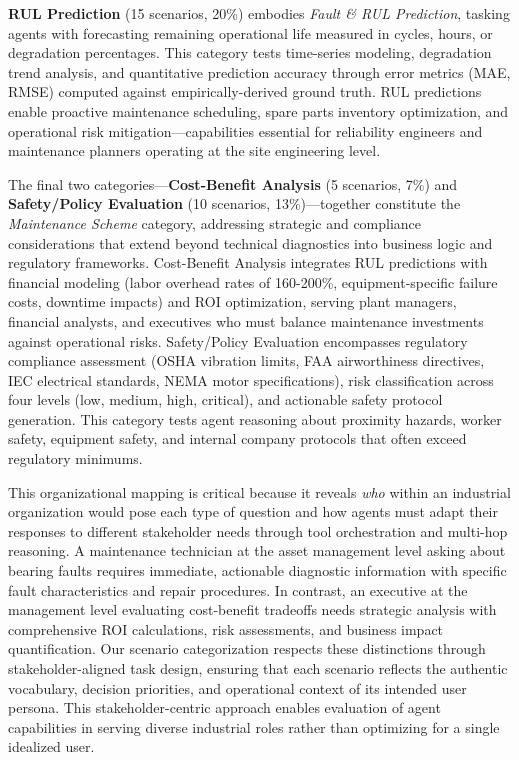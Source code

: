 \documentclass[sigconf]{acmart}
\begin{document}
\textbf{RUL Prediction} (15 scenarios, 20\%) embodies \textit{Fault \& RUL Prediction}, tasking agents with forecasting remaining operational life measured in cycles, hours, or degradation percentages. This category tests time-series modeling, degradation trend analysis, and quantitative prediction accuracy through error metrics (MAE, RMSE) computed against empirically-derived ground truth. RUL predictions enable proactive maintenance scheduling, spare parts inventory optimization, and operational risk mitigation---capabilities essential for reliability engineers and maintenance planners operating at the site engineering level.

The final two categories---\textbf{Cost-Benefit Analysis} (5 scenarios, 7\%) and \textbf{Safety/Policy Evaluation} (10 scenarios, 13\%)---together constitute the \textit{Maintenance Scheme} category, addressing strategic and compliance considerations that extend beyond technical diagnostics into business logic and regulatory frameworks. Cost-Benefit Analysis integrates RUL predictions with financial modeling (labor overhead rates of 160-200\%, equipment-specific failure costs, downtime impacts) and ROI optimization, serving plant managers, financial analysts, and executives who must balance maintenance investments against operational risks. Safety/Policy Evaluation encompasses regulatory compliance assessment (OSHA vibration limits, FAA airworthiness directives, IEC electrical standards, NEMA motor specifications), risk classification across four levels (low, medium, high, critical), and actionable safety protocol generation. This category tests agent reasoning about proximity hazards, worker safety, equipment safety, and internal company protocols that often exceed regulatory minimums.

This organizational mapping is critical because it reveals \textit{who} within an industrial organization would pose each type of question and how agents must adapt their responses to different stakeholder needs through tool orchestration and multi-hop reasoning. A maintenance technician at the asset management level asking about bearing faults requires immediate, actionable diagnostic information with specific fault characteristics and repair procedures. In contrast, an executive at the management level evaluating cost-benefit tradeoffs needs strategic analysis with comprehensive ROI calculations, risk assessments, and business impact quantification. Our scenario categorization respects these distinctions through stakeholder-aligned task design, ensuring that each scenario reflects the authentic vocabulary, decision priorities, and operational context of its intended user persona. This stakeholder-centric approach enables evaluation of agent capabilities in serving diverse industrial roles rather than optimizing for a single idealized user.
\end{document}
